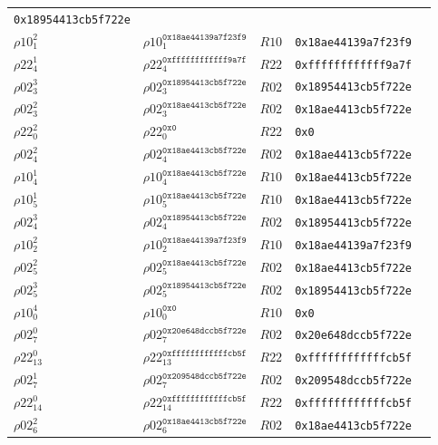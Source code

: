 \begin{longtable}[c]{|l|l|l|l|l|}
  \texttt{0x18954413cb5f722e} \\
  $\rho10_{1}^{2}$ & $\rho10_{1}^{\texttt{0x18ae44139a7f23f9}}$ & $R10$ &
  \texttt{0x18ae44139a7f23f9} \\
  $\rho22_{4}^{1}$ & $\rho22_{4}^{\texttt{0xffffffffffff9a7f}}$ & $R22$ &
  \texttt{0xffffffffffff9a7f} \\
  $\rho02_{3}^{3}$ & $\rho02_{3}^{\texttt{0x18954413cb5f722e}}$ & $R02$ &
  \texttt{0x18954413cb5f722e} \\
  $\rho02_{3}^{2}$ & $\rho02_{3}^{\texttt{0x18ae4413cb5f722e}}$ & $R02$ &
  \texttt{0x18ae4413cb5f722e} \\
  $\rho22_{0}^{2}$ & $\rho22_{0}^{\texttt{0x0}}$ & $R22$ & \texttt{0x0} \\
  $\rho02_{4}^{2}$ & $\rho02_{4}^{\texttt{0x18ae4413cb5f722e}}$ & $R02$ &
  \texttt{0x18ae4413cb5f722e} \\
  $\rho10_{4}^{1}$ & $\rho10_{4}^{\texttt{0x18ae4413cb5f722e}}$ & $R10$ &
  \texttt{0x18ae4413cb5f722e} \\
  $\rho10_{5}^{1}$ & $\rho10_{5}^{\texttt{0x18ae4413cb5f722e}}$ & $R10$ &
  \texttt{0x18ae4413cb5f722e} \\
  $\rho02_{4}^{3}$ & $\rho02_{4}^{\texttt{0x18954413cb5f722e}}$ & $R02$ &
  \texttt{0x18954413cb5f722e} \\
  $\rho10_{2}^{2}$ & $\rho10_{2}^{\texttt{0x18ae44139a7f23f9}}$ & $R10$ &
  \texttt{0x18ae44139a7f23f9} \\
  $\rho02_{5}^{2}$ & $\rho02_{5}^{\texttt{0x18ae4413cb5f722e}}$ & $R02$ &
  \texttt{0x18ae4413cb5f722e} \\
  $\rho02_{5}^{3}$ & $\rho02_{5}^{\texttt{0x18954413cb5f722e}}$ & $R02$ &
  \texttt{0x18954413cb5f722e} \\
  $\rho10_{0}^{4}$ & $\rho10_{0}^{\texttt{0x0}}$ & $R10$ & \texttt{0x0} \\
  $\rho02_{7}^{0}$ & $\rho02_{7}^{\texttt{0x20e648dccb5f722e}}$ & $R02$ &
  \texttt{0x20e648dccb5f722e} \\
  $\rho22_{13}^{0}$ & $\rho22_{13}^{\texttt{0xffffffffffffcb5f}}$ & $R22$ &
  \texttt{0xffffffffffffcb5f} \\
  $\rho02_{7}^{1}$ & $\rho02_{7}^{\texttt{0x209548dccb5f722e}}$ & $R02$ &
  \texttt{0x209548dccb5f722e} \\
  $\rho22_{14}^{0}$ & $\rho22_{14}^{\texttt{0xffffffffffffcb5f}}$ & $R22$ &
  \texttt{0xffffffffffffcb5f} \\
  $\rho02_{6}^{2}$ & $\rho02_{6}^{\texttt{0x18ae4413cb5f722e}}$ & $R02$ &
  \texttt{0x18ae4413cb5f722e} \\

\end{longtable}
